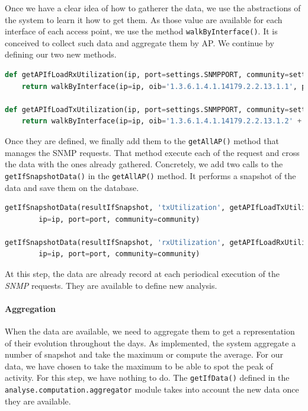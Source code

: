 Once we have a clear idea of how to gatherer the data, we use the abstractions of the system to learn it how to get them. As those value are available for each interface of each access point, we use the method \texttt{walkByInterface()}. It is conceived to collect such data and aggregate them by AP. We continue by defining our two new methods.
\begin{lstlisting}[language=Python, frame=single,breaklines=true,caption={Misleading Error Message}]
def getAPIfLoadRxUtilization(ip, port=settings.SNMPPORT, community=settings.SNMPCOMMUNITY, ap=''):
	return walkByInterface(ip=ip, oib='1.3.6.1.4.1.14179.2.2.13.1.1', port=port, community=community)

def getAPIfLoadTxUtilization(ip, port=settings.SNMPPORT, community=settings.SNMPCOMMUNITY, ap=''):
	return walkByInterface(ip=ip, oib='1.3.6.1.4.1.14179.2.2.13.1.2' + ap, port=port, community=community)
\end{lstlisting}

Once they are defined, we finally add them to the \texttt{getAllAP()} method that manages the SNMP requests. That method execute each of the request and cross the data with the ones already gathered. Concretely, we add two calls to the \texttt{getIfSnapshotData()} in the \texttt{getAllAP()} method. It performs a snapshot of the data and save them on the database.

\begin{lstlisting}[language=Python, frame=single,breaklines=true,caption={Misleading Error Message}]
getIfSnapshotData(resultIfSnapshot, 'txUtilization', getAPIfLoadTxUtilization, 
		ip=ip, port=port, community=community)

getIfSnapshotData(resultIfSnapshot, 'rxUtilization', getAPIfLoadRxUtilization, 
		ip=ip, port=port, community=community)		
\end{lstlisting}

At this step, the data are already record at each periodical execution of the \emph{SNMP} requests. They are available to define new analysis.

\paragraph*{Aggregation} When the data are available, we need to aggregate them to get a representation of their evolution throughout the days. As implemented, the system aggregate a number of snapshot and take the maximum or compute the average. For our data, we have chosen to take the maximum to be able to spot the peak of activity. For this step, we have nothing to do. The \texttt{getIfData()} defined in the \texttt{analyse.computation.aggregator} module takes into account the new data once they are available.

